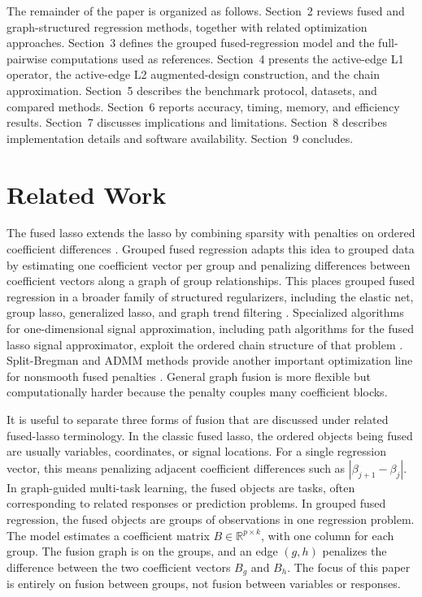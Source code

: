 \documentclass[twoside,11pt]{article}
\newcommand{\R}{\mathbb{R}}
\begin{document}
The remainder of the paper is organized as follows. 
Section~2 reviews fused and graph-structured regression methods, together with related optimization approaches. 
Section~3 defines the grouped fused-regression model and the full-pairwise computations used as references. 
Section~4 presents the active-edge L1 operator, the active-edge L2 augmented-design construction, and the chain approximation. 
Section~5 describes the benchmark protocol, datasets, and compared methods. 
Section~6 reports accuracy, timing, memory, and efficiency results. 
Section~7 discusses implications and limitations. 
Section~8 describes implementation details and software availability. 
Section~9 concludes.


\section{Related Work}

The fused lasso extends the lasso by combining sparsity with penalties on ordered coefficient differences \citep{tibshirani1996lasso,tibshirani2005fused}.
Grouped fused regression adapts this idea to grouped data by estimating one coefficient vector per group and penalizing differences between coefficient vectors along a graph of group relationships.
This places grouped fused regression in a broader family of structured regularizers, including the elastic net, group lasso, generalized lasso, and graph trend filtering \citep{zou2005elastic,yuan2006group,tibshirani2011genlasso,wang2016graphtf}.
Specialized algorithms for one-dimensional signal approximation, including path algorithms for the fused lasso signal approximator, exploit the ordered chain structure of that problem \citep{hoefling2010path}. 
Split-Bregman and ADMM methods provide another important optimization line for nonsmooth fused penalties \citep{ye2011split,boyd2011admm}. 
General graph fusion is more flexible but computationally harder because the penalty couples many coefficient blocks.

It is useful to separate three forms of fusion that are discussed under related fused-lasso terminology. 
In the classic fused lasso, the ordered objects being fused are usually variables, coordinates, or signal locations.
For a single regression vector, this means penalizing adjacent coefficient differences such as $|\beta_{j+1}-\beta_j|$. 
In graph-guided multi-task learning, the fused objects are tasks, often corresponding to related responses or prediction problems. 
In grouped fused regression, the fused objects are groups of observations in one regression problem. 
The model estimates a coefficient matrix $B\in\R^{p\times k}$, with one column for each group. 
The fusion graph is on the groups, and an edge $(g,h)$ penalizes the difference between the two coefficient vectors $B_g$ and $B_h$. 
The focus of this paper is entirely on fusion between groups, not fusion between variables or responses.
\end{document}
